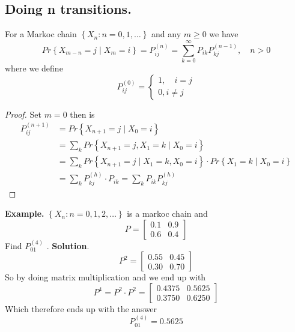 \documentclass{article}
\theoremstyle{remark}
\begin{document}
 \subsection{Doing n transitions.}%
 \label{sub:doing_n_transitions_}

 \begin{theorem}
   For a Markoc chain $\left\{ X_{n}: n= 0,1, \ldots \right\}$ and any $m\ge 0$ we have \[
     Pr \left \{ X_{m-n} = j  \mid X_{m} = i  \right \}  = P _{ij}^{(n)} =  \sum_{k=0}^{\infty}  P _{ik} P_{kj}^{(n-1)} ,  \quad  n>0 
   \] 
   where we define \[
   P_{ij}^{(0)} = \begin{cases}
     1 , \quad  i= j \\
     0, i \neq j 
   \end{cases}
   \] 
 \end{theorem}

 \begin{proof}
   Set $m = 0$ then is \[
   \begin{split}
     P_{ij }^{(n+1)}   & = Pr \left \{ X_{n+1} = j  \mid  X_{0} = i \right \}   \\
     &= \sum_{k}^{}  Pr \left \{ X_{n+1} = j, X_{1} = k  \mid  X_{0} = i \right \}   \\
     &=  \sum_{k}^{} Pr \left \{ X_{n+1} = j  \mid  X_{1} = k, X_{0} = i \right \} \cdot Pr \left \{ X_{1} = k  \mid  X_{0} = i \right \}   \\
     &= \sum_{k}^{} P_{kj}^{(h)} \cdot P_{ik}  = \sum_{k}^{}  P_{ik} P_{kj}^{(h)}
   \end{split} 
   \] 
 \end{proof}
 
 \begin{tcolorbox}
   \textbf{Example.} $\left\{ X_{n} : n= 0,1,2, \ldots \right\}$ is a markoc chain and \[
   P = \begin{bmatrix} 
   0.1  &  0.9 \\
   0.6  &  0.4 
   \end{bmatrix} 
   \] 
   Find $P_{01}^{(4)}$ .
   \textbf{Solution}. \[
   P^2 = \begin{bmatrix} 
   0.55  &  0.45 \\
   0.30  &  0.70
   \end{bmatrix} 
   \] 
   So by doing matrix multiplication and we end up with \[
   P^{4} = P^{2} \cdot  P^{2} = \begin{bmatrix} 
   0.4375  &  0.5625 \\
   0.3750  &  0.6250
   \end{bmatrix} 
   \] 
   Which therefore ends up with the answer \[
   P_{01}^{(4)} = 0.5625
   \] 
 \end{tcolorbox}
 
\end{document}
